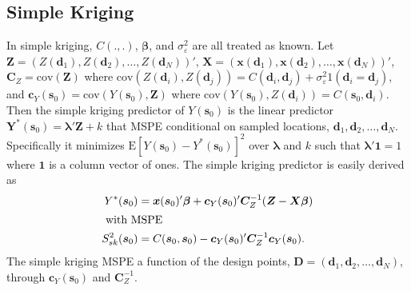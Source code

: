 \documentclass[12pt]{article}
\begin{document}
\subsection{Simple Kriging}
In simple kriging, $C(.,.)$, $\bm{\beta}$, and $\sigma^2_{\varepsilon}$ are all treated as known. Let $\bm{Z} = (Z(\bm{d}_1), Z(\bm{d}_2), \dots, Z(\bm{d}_N) )'$, $\bm{X} = (\bm{x}(\bm{d}_1), \bm{x}(\bm{d}_2), \dots, \bm{x}(\bm{d}_N))'$, $\bm{C}_Z = \mathrm{cov}(\bm{Z})$ where $\mathrm{cov}(Z(\bm{d}_i), Z(\bm{d}_j)) = C(\bm{d}_i,\bm{d}_j) + \sigma^2_\varepsilon 1(\bm{d}_i = \bm{d}_j)$, and $\bm{c}_Y(\bm{s}_0) = \mathrm{cov}(Y(\bm{s}_0), \bm{Z})$ where $\mathrm{cov}(Y(\bm{s}_0), Z(\bm{d}_i)) = C(\bm{s}_0, \bm{d}_i)$. Then the simple kriging predictor of $Y(\bm{s}_0)$ is the linear predictor $\bm{Y}^*(\bm{s}_0) = \bm{\lambda}'\bm{Z} + k$ that MSPE conditional on sampled locations, $\bm{d}_1, \bm{d}_2, \dots, \bm{d}_N$. Specifically it minimizes $\mathrm{E}[Y(\bm{s}_0) - Y^*(\bm{s}_0)]^2$ over $\bm{\lambda}$ and $k$ such that $\bm{\lambda}'\bm{1}=1$ where $\bm{1}$ is a column vector of ones. The simple kriging predictor is easily derived as 
\begin{align*}
Y^*(\bm{s}_0) &= \bm{x}(\bm{s}_0)'\bm{\beta} + \bm{c}_Y(\bm{s}_0)'\bm{C}_Z^{-1}(\bm{Z} - \bm{X}\bm{\beta})\\
\intertext{ with MSPE }
S_{sk}^{2}(\bm{s}_0) &= C(\bm{s}_0,\bm{s}_0) - \bm{c}_Y(\bm{s}_0)'\bm{C}_Z^{-1}\bm{c}_Y(\bm{s}_0).
\end{align*}
The simple kriging MSPE a function of the design points, $\bm{D}=(\bm{d}_1,\bm{d}_2,\dots,\bm{d}_N)$, through $\bm{c}_Y(\bm{s}_0)$ and $\bm{C}_Z^{-1}$. 
\end{document}
